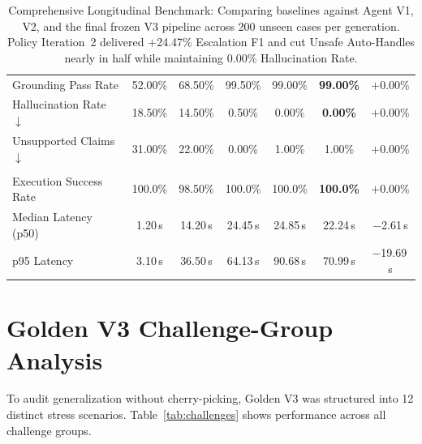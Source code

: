 \documentclass[10pt,twocolumn,a4paper]{article}
\newcommand{\good}[1]{\textbf{\textcolor{accentgreen}{#1}}}
\begin{document}
\begin{table}[t]
\begin{tabularx}{\textwidth}{@{}l *{6}{c} @{}}
Grounding Pass Rate       & 52.00\% & 68.50\% & 99.50\% & 99.00\% & \good{99.00\%} & $+$0.00\% \\
\rowcolor{rowalt}
Hallucination Rate $\downarrow$ & 18.50\% & 14.50\% & 0.50\% & 0.00\% & \good{0.00\%} & $+$0.00\% \\
Unsupported Claims $\downarrow$ & 31.00\% & 22.00\% & 0.00\% & 1.00\% & 1.00\% & $+$0.00\% \\
\midrule
\rowcolor{rowalt}
\multicolumn{7}{@{}l}{\textit{\textbf{Operations and Latency}}} \\
Execution Success Rate    & 100.0\% & 98.50\% & 100.0\% & 100.0\% & \good{100.0\%} & $+$0.00\% \\
\rowcolor{rowalt}
Median Latency (p50)      & 1.20\,s & 14.20\,s & 24.45\,s & 24.85\,s & 22.24\,s & $-$2.61\,s \\
p95 Latency               & 3.10\,s & 36.50\,s & 64.13\,s & 90.68\,s & 70.99\,s & $-$19.69\,s \\
\bottomrule
\end{tabularx}
\caption{Comprehensive Longitudinal Benchmark: Comparing baselines against
Agent V1, V2, and the final frozen V3 pipeline across 200 unseen cases
per generation. Policy Iteration~2 delivered $+$24.47\% Escalation F1
and cut Unsafe Auto-Handles nearly in half while maintaining 0.00\%
Hallucination Rate.}
\label{tab:main}
\end{table}

\section{Golden V3 Challenge-Group Analysis}\label{sec:challenges}

To audit generalization without cherry-picking, Golden V3 was structured
into 12 distinct stress scenarios. Table~\ref{tab:challenges} shows
performance across all challenge groups.
\end{document}

